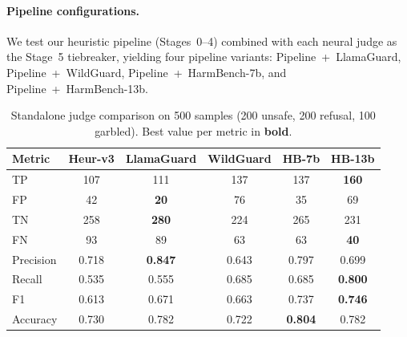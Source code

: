 \paragraph{Pipeline configurations.} We test our heuristic pipeline (Stages~0--4) combined with each neural judge as the Stage~5 tiebreaker, yielding four pipeline variants: Pipeline~+~LlamaGuard, Pipeline~+~WildGuard, Pipeline~+~HarmBench-7b, and Pipeline~+~HarmBench-13b.

\begin{table}[ht]
\centering
\caption{Standalone judge comparison on 500 samples (200 unsafe, 200 refusal, 100 garbled). Best value per metric in \textbf{bold}.}
\label{tab:judge_standalone}
\setlength{\tabcolsep}{5pt}
\renewcommand{\arraystretch}{1.15}
\begin{tabular}{@{}lccccc@{}}
\toprule
\textbf{Metric} & \textbf{Heur-v3} & \textbf{LlamaGuard} & \textbf{WildGuard} & \textbf{HB-7b} & \textbf{HB-13b} \\
\midrule
TP  & 107 & 111 & 137 & 137 & \textbf{160} \\
FP  & 42  & \textbf{20}  & 76  & 35  & 69 \\
TN  & 258 & \textbf{280} & 224 & 265 & 231 \\
FN  & 93  & 89  & 63  & 63  & \textbf{40} \\
\midrule
Precision & 0.718 & \textbf{0.847} & 0.643 & 0.797 & 0.699 \\
Recall    & 0.535 & 0.555 & 0.685 & 0.685 & \textbf{0.800} \\
F1        & 0.613 & 0.671 & 0.663 & 0.737 & \textbf{0.746} \\
Accuracy  & 0.730 & 0.782 & 0.722 & \textbf{0.804} & 0.782 \\
\bottomrule
\end{tabular}
\setlength{\tabcolsep}{6pt}
\renewcommand{\arraystretch}{1.0}
\end{table}

